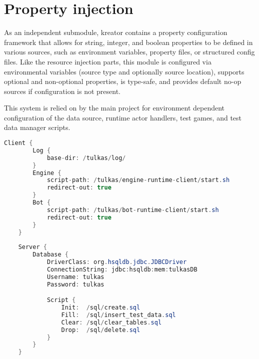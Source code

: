 	
	
	\section{Property injection}
	
	As an independent submodule, kreator contains a property configuration framework that allows for string, integer, and boolean properties to be defined in various sources, such as environment variables, property files, or structured config files. Like the resource injection parts, this module is configured via environmental variables (source type and optionally source location), supports optional and non-optional properties, is type-safe, and provides default no-op sources if configuration is not present.
	
	This system is relied on by the main project for environment dependent configuration of the data source, runtime actor handlers, test games, and test data manager scripts.
	
		\begin{center}
			\begin{minipage}{13cm}
		\begin{lstlisting}[language=Java, title={\emph{Sample config} -- \code{tulkas.conf}}]
	Client {
		Log {
			base-dir: /tulkas/log/
		}
		Engine {
        	script-path: /tulkas/engine-runtime-client/start.sh
        	redirect-out: true
		}
		Bot {
        	script-path: /tulkas/bot-runtime-client/start.sh
        	redirect-out: true
    	}
	}
	
	Server {
		Database {
        	DriverClass: org.hsqldb.jdbc.JDBCDriver
        	ConnectionString: jdbc:hsqldb:mem:tulkasDB
        	Username: tulkas
        	Password: tulkas

        	Script {
            	Init:  /sql/create.sql
            	Fill:  /sql/insert_test_data.sql
            	Clear: /sql/clear_tables.sql
            	Drop:  /sql/delete.sql
        	}
    	}
	}
		\end{lstlisting}
			\end{minipage}
		\end{center}
		
